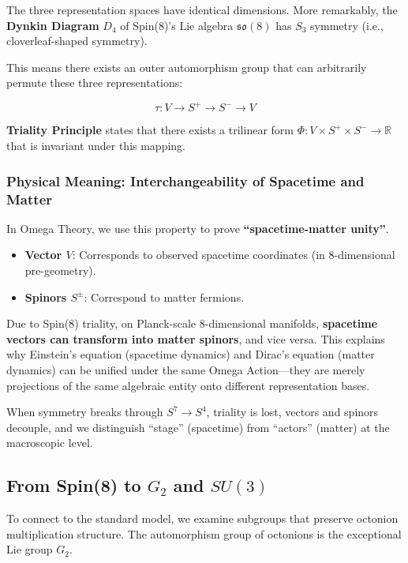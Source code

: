 The three representation spaces have identical dimensions. More remarkably, the \textbf{Dynkin Diagram} $D_4$ of Spin(8)'s Lie algebra $\mathfrak{so}(8)$ has $S_3$ symmetry (i.e., cloverleaf-shaped symmetry).

This means there exists an outer automorphism group that can arbitrarily permute these three representations:

\[\tau: V \to S^+ \to S^- \to V\]

\textbf{Triality Principle} states that there exists a trilinear form $\Phi: V \times S^+ \times S^- \to \mathbb{R}$ that is invariant under this mapping.

\subsubsection{Physical Meaning: Interchangeability of Spacetime and Matter}

In Omega Theory, we use this property to prove \textbf{``spacetime-matter unity''}.

\begin{itemize}
\item \textbf{Vector $V$}: Corresponds to observed spacetime coordinates (in 8-dimensional pre-geometry).
\item \textbf{Spinors $S^\pm$}: Correspond to matter fermions.
\end{itemize}

Due to Spin(8) triality, on Planck-scale 8-dimensional manifolds, \textbf{spacetime vectors can transform into matter spinors}, and vice versa. This explains why Einstein's equation (spacetime dynamics) and Dirac's equation (matter dynamics) can be unified under the same Omega Action---they are merely projections of the same algebraic entity onto different representation bases.

When symmetry breaks through $S^7 \to S^4$, triality is lost, vectors and spinors decouple, and we distinguish ``stage'' (spacetime) from ``actors'' (matter) at the macroscopic level.

\subsection{From Spin(8) to \texorpdfstring{$G_2$}{G2} and \texorpdfstring{$SU(3)$}{SU3}}

To connect to the standard model, we examine subgroups that preserve octonion multiplication structure.
The automorphism group of octonions is the exceptional Lie group \textbf{$G_2$}.

